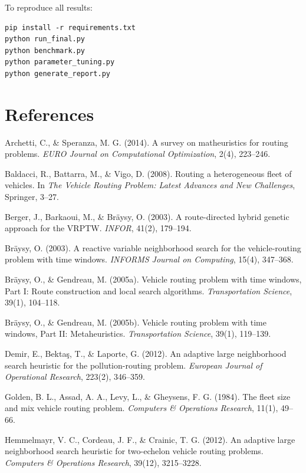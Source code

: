 \documentclass[11pt]{article}
\begin{document}
\noindent To reproduce all results:
\begin{verbatim}
pip install -r requirements.txt
python run_final.py
python benchmark.py
python parameter_tuning.py
python generate_report.py
\end{verbatim}

\section*{References}

\begin{enumerate}[label={[\arabic*]}, leftmargin=*, itemsep=2pt]
    \item Archetti, C., \& Speranza, M. G. (2014). A survey on matheuristics for routing problems. \textit{EURO Journal on Computational Optimization}, 2(4), 223--246.
    \item Baldacci, R., Battarra, M., \& Vigo, D. (2008). Routing a heterogeneous fleet of vehicles. In \textit{The Vehicle Routing Problem: Latest Advances and New Challenges}, Springer, 3--27.
    \item Berger, J., Barkaoui, M., \& Br\"aysy, O. (2003). A route-directed hybrid genetic approach for the VRPTW. \textit{INFOR}, 41(2), 179--194.
    \item Br\"aysy, O. (2003). A reactive variable neighborhood search for the vehicle-routing problem with time windows. \textit{INFORMS Journal on Computing}, 15(4), 347--368.
    \item Br\"aysy, O., \& Gendreau, M. (2005a). Vehicle routing problem with time windows, Part I: Route construction and local search algorithms. \textit{Transportation Science}, 39(1), 104--118.
    \item Br\"aysy, O., \& Gendreau, M. (2005b). Vehicle routing problem with time windows, Part II: Metaheuristics. \textit{Transportation Science}, 39(1), 119--139.
    \item Demir, E., Bekta\c{s}, T., \& Laporte, G. (2012). An adaptive large neighborhood search heuristic for the pollution-routing problem. \textit{European Journal of Operational Research}, 223(2), 346--359.
    \item Golden, B. L., Assad, A. A., Levy, L., \& Gheysens, F. G. (1984). The fleet size and mix vehicle routing problem. \textit{Computers \& Operations Research}, 11(1), 49--66.
    \item Hemmelmayr, V. C., Cordeau, J. F., \& Crainic, T. G. (2012). An adaptive large neighborhood search heuristic for two-echelon vehicle routing problems. \textit{Computers \& Operations Research}, 39(12), 3215--3228.

\end{enumerate}
\end{document}
